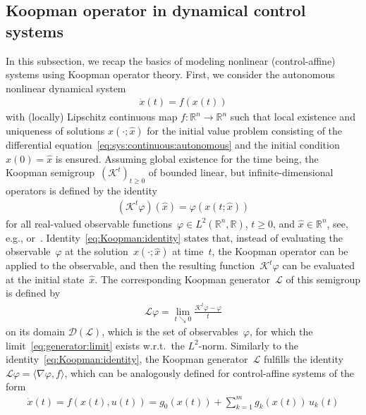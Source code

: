 \documentclass[a4paper, reqno]{amsart}
\newcommand{\R}{\ensuremath{\mathbb R}}
\begin{document}
    \subsection{Koopman operator in dynamical control systems}
    \label{subsec:Koopman}
In this subsection, we recap the basics of modeling nonlinear (control-affine) systems using Koopman operator theory. 
First, we consider the autonomous nonlinear dynamical system
\begin{align} \label{eq:sys:continuous:autonomous}
    \dot{x}(t) = f(x(t))
\end{align}
with (locally) Lipschitz continuous map $f:\R^n \rightarrow \R^n$ such that local existence and uniqueness of solutions $x(\cdot; \hat{x})$ for the initial value problem consisting of the differential equation~\eqref{eq:sys:continuous:autonomous} and the initial condition $x(0) = \hat{x}$ is ensured.
Assuming global existence for the time being, 
the Koopman semigroup~$(\mathcal{K}^t)_{t \geq 0}$ of bounded linear, but infinite-dimensional operators is defined by the identity
\begin{align}\label{eq:Koopman:identity}
    (\mathcal{K}^t\varphi)(\hat{x}) = \varphi(x(t;\hat{x}))
\end{align}
for all real-valued observable functions~$\varphi \in L^2(\R^n, \R)$, $t \geq 0$, and $\hat{x} \in \mathbb{R}^n$, see, e.g., \cite[pp.\ 3-33]{mauroy:mezic:susuki:2020} or~\cite[Proposition 3.4]{philipp2025error}. 
Identity~\eqref{eq:Koopman:identity} states that, instead of evaluating the observable~$\varphi$ at the solution~$x(\cdot;\hat{x})$ at time~$t$, the Koopman operator can be applied to the observable, and then the resulting function~$\mathcal{K}^t\varphi$ can be evaluated at the initial state~$\hat{x}$. 
The corresponding Koopman generator~$\mathcal{L}$ of this semigroup is defined by 
\begin{align}\label{eq:generator:limit}
    \mathcal{L}\varphi = \lim_{t \searrow 0} \frac{\mathcal{K}^t \varphi - \varphi}{t}
\end{align}
on its domain $\mathcal{D}(\mathcal{L})$, which is 
the set of observables~$\varphi$, for which the limit~\eqref{eq:generator:limit} exists w.r.t.\  
the $L^2$-norm. 
Similarly to the identity~\eqref{eq:Koopman:identity}, the Koopman generator~$\mathcal{L}$ fulfills 
the identity $\mathcal{L} \varphi = \langle \nabla \varphi, f \rangle$, which can be analogously defined for control-affine systems of the form
\begin{align}\label{eq:sys:continuous}
    \dot{x}(t) = f(x(t), u(t)) =  g_0(x(t)) + \sum\nolimits_{k = 1}^m g_k(x(t))\,u_k(t)
\end{align}
\end{document}
